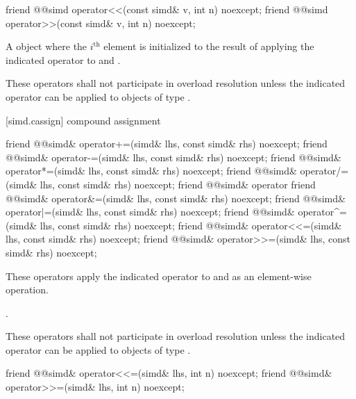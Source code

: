 \begin{itemdecl}
friend @@simd operator<<(const simd& v, int n) noexcept;
friend @@simd operator>>(const simd& v, int n) noexcept;
\end{itemdecl}

\begin{itemdescr}
  \pnum\returns
  A  object where the $i^\text{th}$ element is initialized to the result of applying the indicated operator to  and  \foralli.

  \pnum\remarks
  These operators shall not participate in overload resolution unless the indicated operator can be applied to objects of type .
\end{itemdescr}

[simd.cassign]{ compound assignment}

\begin{itemdecl}
friend @@simd& operator+=(simd& lhs, const simd& rhs) noexcept;
friend @@simd& operator-=(simd& lhs, const simd& rhs) noexcept;
friend @@simd& operator*=(simd& lhs, const simd& rhs) noexcept;
friend @@simd& operator/=(simd& lhs, const simd& rhs) noexcept;
friend @@simd& operator%
friend @@simd& operator&=(simd& lhs, const simd& rhs) noexcept;
friend @@simd& operator|=(simd& lhs, const simd& rhs) noexcept;
friend @@simd& operator^=(simd& lhs, const simd& rhs) noexcept;
friend @@simd& operator<<=(simd& lhs, const simd& rhs) noexcept;
friend @@simd& operator>>=(simd& lhs, const simd& rhs) noexcept;
\end{itemdecl}

\begin{itemdescr}
  \pnum\effects
  These operators apply the indicated operator to  and  as an element-wise operation.

  \pnum\returns
  .

  \pnum\remarks
  These operators shall not participate in overload resolution unless the indicated operator can be applied to objects of type .
\end{itemdescr}

\begin{itemdecl}
friend @@simd& operator<<=(simd& lhs, int n) noexcept;
friend @@simd& operator>>=(simd& lhs, int n) noexcept;
\end{itemdecl}


